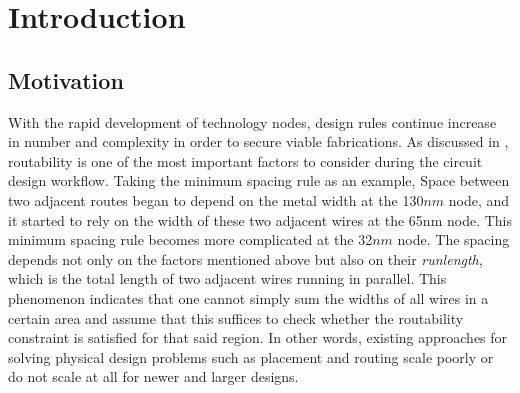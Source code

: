 \section{Introduction}
\label{sec:intro}
\subsection{Motivation}
With the rapid development of technology nodes, design rules continue increase in number and complexity in order to secure viable fabrications.
As discussed in \cite{theimportance}, routability is one of the most important factors to consider during the circuit design workflow.  Taking the minimum spacing rule as an example, Space between two adjacent routes began to depend on the metal width at the 130$nm$ node, and it started to rely on the width of these two adjacent wires at the 65nm node.
This minimum spacing rule becomes more complicated at the 32$nm$ node.
The spacing depends not only on the factors mentioned above but also on their \textit{runlength}, which is the total length of two adjacent wires running in parallel.
This phenomenon indicates that one cannot simply sum the widths of all wires in a certain area and assume that this suffices to check whether the routability constraint is satisfied for that said region.
In other words, existing approaches for solving physical design problems such as placement and routing scale poorly or do not scale at all for newer and larger designs.


